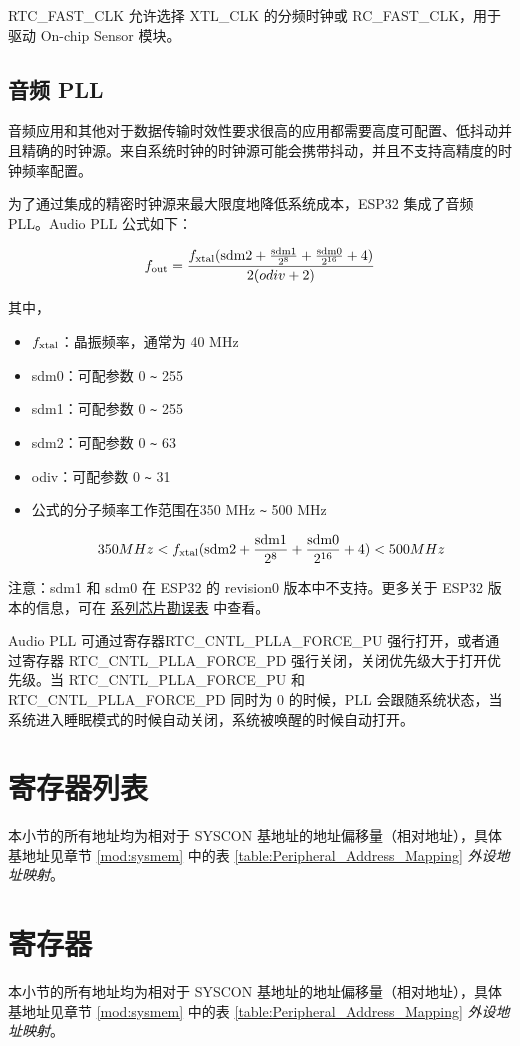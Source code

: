 \documentclass[main\_\_CN.tex]{subfiles}
\begin{document}
RTC\_FAST\_CLK 允许选择 XTL\_CLK 的分频时钟或 RC\_FAST\_CLK，用于驱动 On-chip Sensor 模块。

\subsection{音频 PLL}\label{audiopll}
音频应用和其他对于数据传输时效性要求很高的应用都需要高度可配置、低抖动并且精确的时钟源。来自系统时钟的时钟源可能会携带抖动，并且不支持高精度的时钟频率配置。


为了通过集成的精密时钟源来最大限度地降低系统成本，ESP32 集成了音频 PLL。Audio PLL 公式如下：

\[
f_{\rm{out}} = \frac{f_{\rm{xtal}}(\rm{sdm2}+\frac{\rm{sdm1}}{2^8}+\frac{\rm{sdm0}}{2^{16}}+4)}{2(odiv+2)}
\]

其中，
\begin{itemize}
    \item \begin{math}f_{\rm{xtal}}\end{math}：晶振频率，通常为 40 MHz
    \item sdm0：可配参数 0 \verb+~+ 255
    \item sdm1：可配参数 0 \verb+~+ 255
    \item sdm2：可配参数 0 \verb+~+ 63
    \item odiv：可配参数 0 \verb+~+ 31
    \item 公式的分子频率工作范围在350 MHz \verb+~+ 500 MHz

\[
350 MHz<{f_{\rm{xtal}}(\rm{sdm2}+\frac{\rm{sdm1}}{2^8}+\frac{\rm{sdm0}}{2^{16}}+4)}<500 MHz
\]

\end{itemize}

注意：sdm1 和 sdm0 在 ESP32 的 revision0 版本中不支持。更多关于 ESP32 版本的信息，可在 \href{\linkprefix\linkchiperrataCN}{\chipseries{} 系列芯片勘误表} 中查看。

Audio PLL 可通过寄存器RTC\_CNTL\_PLLA\_FORCE\_PU 强行打开，或者通过寄存器 RTC\_CNTL\_PLLA\_FORCE\_PD 强行关闭，关闭优先级大于打开优先级。当 RTC\_CNTL\_PLLA\_FORCE\_PU 和 RTC\_CNTL\_PLLA\_FORCE\_PD 同时为 0 的时候，PLL 会跟随系统状态，当系统进入睡眠模式的时候自动关闭，系统被唤醒的时候自动打开。

\section{寄存器列表}\label{sec:resclk-reg-summ}

本小节的所有地址均为相对于 SYSCON 基地址的地址偏移量（相对地址），具体基地址见章节 \ref{mod:sysmem} \textit{} 中的表 \ref{table:Peripheral_Address_Mapping} \textit{外设地址映射}。



\section{寄存器}\label{sec:resclk-reg-desc}

本小节的所有地址均为相对于 SYSCON 基地址的地址偏移量（相对地址），具体基地址见章节 \ref{mod:sysmem} \textit{} 中的表 \ref{table:Peripheral_Address_Mapping} \textit{外设地址映射}。


\end{document}
